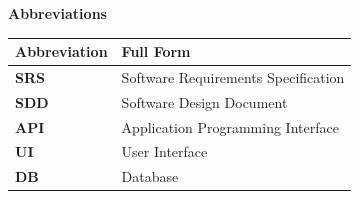 
\newpage
\thispagestyle{plain}

\begin{center}
\textbf{\LARGE Abbreviations}
\end{center}

\vspace{1cm}

\begin{table}[h]
\centering
\renewcommand{\arraystretch}{1.4}
\begin{tabularx}{\textwidth}{|p{3cm}|X|}
\hline
\textbf{Abbreviation} & \textbf{Full Form} \\
\hline
\textbf{SRS} & Software Requirements Specification \\ \hline
\textbf{SDD} & Software Design Document \\ \hline
\textbf{API} & Application Programming Interface \\ \hline
\textbf{UI} & User Interface \\ \hline
\textbf{DB} & Database \\ \hline
\end{tabularx}
\end{table}

\newpage
